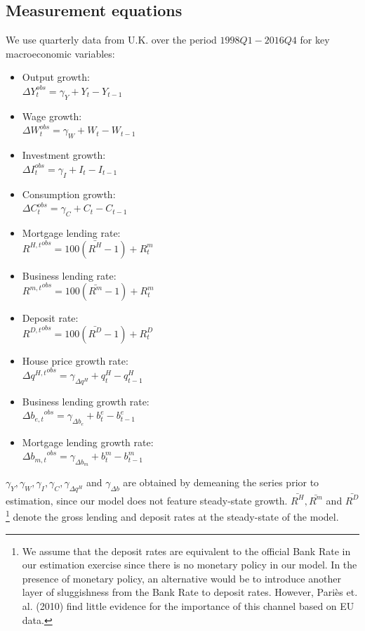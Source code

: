 \documentclass[12pt]{article}
\numberwithin{equation}{section}
\begin{document}
\subsection*{Measurement equations} 

We use quarterly data from U.K. over the period $1998Q1-2016Q4$ for key macroeconomic variables: 

\begin{itemize}
\item Output growth:\\
$\Delta Y_t^{obs}=\gamma_Y+ Y_t-Y_{t-1}$

\item Wage growth:\\
$\Delta W_t^{obs}=\gamma_W+ W_t-W_{t-1}$

\item Investment growth:\\
$\Delta I_t^{obs}=\gamma_I+ I_t-I_{t-1}$

\item Consumption growth:\\
$\Delta C_t^{obs}=\gamma_C+ C_t-C_{t-1}$

\item Mortgage lending rate:\\
${R^{H,t}}^{obs}=100(\bar{R^H}-1) + R^m_t$
\item Business lending rate:\\
${R^{m,t}}^{obs}=100(\bar{R^m}-1) + R^m_t$

\item Deposit rate: \\
${R^{D,t}}^{obs}=100(\bar{R^D}-1) + R^D_t$


\item House price growth rate: \\
$\Delta {q^{H,t}}^{obs} =\gamma_{\Delta q^H} + q^H_t - q^H_{t-1}$
\item Business lending growth rate:\\
$\Delta {b_{e,t}}^{obs}=\gamma_{\Delta b_e}+  b^e_t - b^e_{t-1} $

\item Mortgage lending growth rate:\\
$\Delta {b_{m,t}}^{obs}=\gamma_{\Delta b_m}+  b^m_t - b^m_{t-1} $

\end{itemize}

$\gamma_Y,\gamma_W,\gamma_I,\gamma_C,\gamma_{\Delta q^H} $ and $\gamma_{\Delta b}$ are obtained by demeaning the series prior to estimation, since our model does not feature steady-state growth. $\bar{R^H}, \bar{R^m}$ and $\bar{R^D}$\footnote{We assume that the deposit rates are equivalent to the official Bank Rate in our estimation exercise since there is no monetary policy in our model. In the presence of monetary policy, an alternative would be to introduce another layer of sluggishness from the Bank Rate to deposit rates. However, Pariès et. al. (2010) find little evidence for the importance of this channel based on EU data.} denote the gross lending and deposit rates at the steady-state of the model.  
\end{document}
